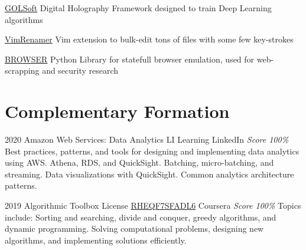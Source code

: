 \documentclass[11pt,a4paper]{moderncv}
\begin{document}
    \cventry{}
        {\href{https://github.com/pointtonull/golsoft}{GOLSoft}}
        {Digital Holography Framework designed
         to train Deep Learning algorithms}
        {}{}{}

    \cventry{}
        {\href{https://github.com/pointtonull/vimrenamer}{VimRenamer}}
        {Vim extension to bulk-edit tons of files with some few key-strokes}
        {}{}{}

    \cventry{}
        {\href{https://github.com/pointtonull/browser}{BROWSER}}
        {Python Library for statefull browser emulation,
         used for web-scrapping and security research}
        {}{}{}



\section{Complementary Formation}


\cventry
    {2020}
    {Amazon Web Services: Data Analytics}
    {LI Learning}
    {LinkedIn}
    {\textit{Score 100\%}}
    {
        Best practices, patterns, and tools for designing  %
        and implementing data analytics using AWS.         %
        Athena, RDS, and QuickSight.                       %
        Batching, micro-batching, and streaming.           %
        Data visualizations with QuickSight.               %
        Common analytics architecture patterns.            %
    }


\cventry
    {2019}
    {Algorithmic Toolbox}
    {License
        \href{https://www.coursera.org/account/accomplishments/verify/RHEQF7SFADL6}
        {RHEQF7SFADL6}
    }
    {Coursera}
    {\textit{Score 100\%}}
    {
        Topics include:                              %
            Sorting and searching,                   %
            divide and conquer,                      %
            greedy algorithms,                       %
            and dynamic programming.                 %
            Solving computational problems,          %
            designing new algorithms,                %
            and implementing solutions efficiently.  %
    }
\end{document}
